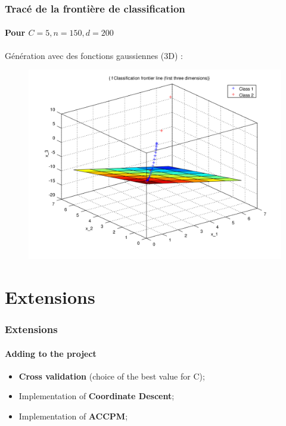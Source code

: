 \documentclass{beamer}
\begin{document}
\begin{frame}
\frametitle{Tracé de la frontière de classification}
\framesubtitle{Pour $C = 5, n = 150, d = 200$}

Génération avec des fonctions gaussiennes (3D) :

         \begin{figure}
         \centering
         \includegraphics[scale=0.4]{images/plane5.png}
         \end{figure}

\end{frame}

\section{Extensions}

\begin{frame}
\tableofcontents[currentsection]
\end{frame}

\begin{frame}
\frametitle{Extensions}
\framesubtitle{Adding to the project}

\begin{itemize}
\item \textbf{Cross validation} (choice of the best value for C);

\bigskip
\pause

\item Implementation of \textbf{Coordinate Descent};

\bigskip
\pause

\item Implementation of \textbf{ACCPM};

\end{itemize}

\end{frame}
\end{document}
